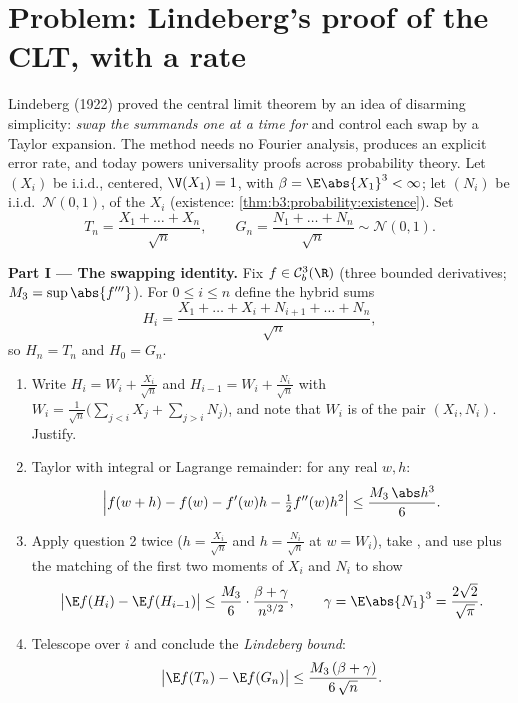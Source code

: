 \section{Problem: Lindeberg's proof of the CLT, with a
rate}

\begin{problem}
\label{pb:b3:clt:1}
Lindeberg (1922) proved the central limit theorem by an idea
of disarming simplicity: \emph{swap the summands one at a
time for } and control each swap by a Taylor
expansion. The method needs no Fourier analysis, produces an
explicit error rate, and today powers universality proofs
across probability theory. Let $(X_i)$ be i.i.d., centered,
$\V(X_1) = 1$, with $\beta = \E\abs{X_1}^3 < \infty$; let
$(N_i)$ be i.i.d.\ $\mathcal N(0,1)$,  of the
$X_i$ (existence: \cref{thm:b3:probability:existence}). Set
\[
T_n = \frac{X_1 + \dots + X_n}{\sqrt n},
\qquad
G_n = \frac{N_1 + \dots + N_n}{\sqrt n} \sim \mathcal N(0,1).
\]

\medskip
\noindent\textbf{Part I --- The swapping identity.} Fix $f
\in \mathcal C^3_b(\R)$ (three bounded 
derivatives; $M_3 = \sup\abs{f'''}$). For $0 \leq i \leq n$
define the hybrid sums
\[
H_i = \frac{X_1 + \dots + X_i + N_{i+1} + \dots +
N_n}{\sqrt n},
\]
so $H_n = T_n$ and $H_0 = G_n$.
\begin{enumerate}
  \item Write $H_i = W_i + \frac{X_i}{\sqrt n}$ and $H_{i-1}
        = W_i + \frac{N_i}{\sqrt n}$ with $W_i =
        \frac{1}{\sqrt n}\bigl(\sum_{j<i}X_j +
        \sum_{j>i}N_j\bigr)$, and note that $W_i$ is
         of the pair $(X_i, N_i)$. Justify.
  \item Taylor with integral or Lagrange remainder: for any
        real $w, h$:
        \[
        \Bigl|f(w + h) - f(w) - f'(w)h -
        \tfrac12f''(w)h^2\Bigr| \leq
        \frac{M_3\,\abs h^3}{6} .
        \]
  \item Apply question 2 twice ($h = \frac{X_i}{\sqrt n}$ and
        $h = \frac{N_i}{\sqrt n}$ at $w = W_i$), take
        , and use  plus the matching
        of the first two moments of $X_i$ and $N_i$ to show
        \[
        \bigl|\E f(H_i) - \E f(H_{i-1})\bigr|
        \leq \frac{M_3}{6}\cdot
        \frac{\beta + \gamma}{n^{3/2}},
        \qquad \gamma = \E\abs{N_1}^3 =
        \frac{2\sqrt2}{\sqrt\pi} .
        \]
  \item Telescope over $i$ and conclude the \emph{Lindeberg
        bound}:
        \[
        \bigl|\E f(T_n) - \E f(G_n)\bigr| \leq
        \frac{M_3\,(\beta + \gamma)}{6\,\sqrt n} .
        \]
\end{enumerate}


\end{problem}
